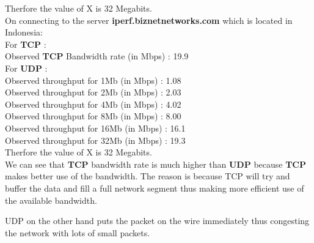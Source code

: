 \documentclass{article}
\theoremstyle{remark}
\newcommand{\tbf}[1]{\textbf{#1}}
\begin{document}
Therfore the value of X is 32 Megabits.\\



On connecting to the server \tbf{iperf.biznetnetworks.com} which is located in Indonesia: \\
For \tbf{TCP} : \\
Observed \tbf{TCP} Bandwidth rate (in Mbps) : 19.9  \\
For \tbf{UDP} :\\
Observed throughput for 1Mb  (in Mbps) : 1.08 \\
Observed throughput for 2Mb  (in Mbps) : 2.03 \\
Observed throughput for 4Mb  (in Mbps) : 4.02 \\
Observed throughput for 8Mb  (in Mbps) : 8.00 \\
Observed throughput for 16Mb (in Mbps) : 16.1 \\
Observed throughput for 32Mb (in Mbps) : 19.3 \\

Therfore the value of X is 32 Megabits.\\

We can see that \tbf{TCP} bandwidth rate is much higher than \tbf{UDP} because \tbf{TCP} 
makes better use of the bandwidth.
The reason is because TCP will try and buffer the data and fill a full network segment thus making more efficient use of the available bandwidth.

UDP on the other hand puts the packet on the wire immediately thus congesting the network with lots of small packets.
\end{document}
